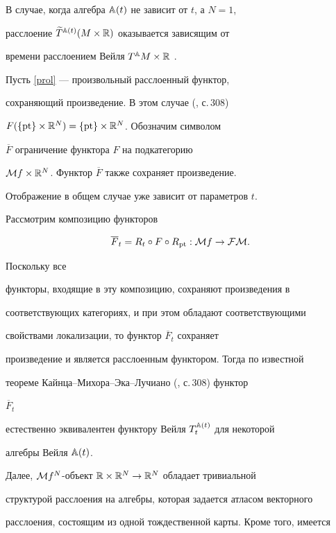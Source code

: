В случае, когда алгебра ${\Bbb A}(t)$ не зависит от $t$, а $N=1$,


расслоение $\widetilde T{}^{{\Bbb A}(t)}(M\times{\Bbb R})$ оказывается зависящим от


времени расслоением Вейля ${T}^{{\Bbb A}}M\times{\Bbb R}$ \cite{Doup-Kol}.





Пусть \eqref{prol} --- произвольный расслоенный функтор,


сохраняющий произведение. В этом случае (\cite{KMS}, с.\,308)


$F(\{\operatorname{pt}\}\times{\Bbb R}^N)=\{\operatorname{pt}\}\times{\Bbb R}^N$. Обозначим символом


$\overline{F}$ ограничение функтора $F$ на подкатегорию


${\cal M} f\times{\Bbb R}^N$. Функтор $\overline{F}$ также сохраняет произведение.


Отображение в общем случае  уже зависит от параметров $t$.





Рассмотрим композицию функторов


\begin{equation*}


\overline{F}_t=R_t\circ F\circ R_{\pt}:\M f\to\FM.


\end{equation*}


Поскольку все


функторы, входящие в эту композицию, сохраняют произведения в


соответствующих категориях, и при этом обладают соответствующими


свойствами локализации, то функтор $\overline{F}_t$ сохраняет


произведение и является расслоенным функтором. Тогда по известной


теореме Кайнца--Михора--Эка--Лучиано (\cite{KMS}, с.\,308) функтор


$\overline{F}_t$


естественно эквивалентен функтору Вейля $T^{{\Bbb A}(t)}_t$ для некоторой


алгебры Вейля ${\Bbb A}(t)$.





Далее, ${\cal M} f^N$-объект ${\Bbb R}\times{\Bbb R}^N\rightarrow{\Bbb R}^N$ обладает тривиальной


структурой расслоения на алгебры, которая задается атласом векторного


расслоения, состоящим из одной тождественной карты. Кроме того, имеется


